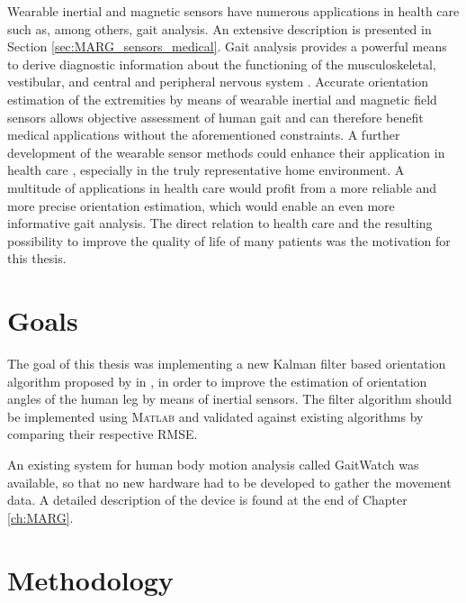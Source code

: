 Wearable inertial and magnetic sensors have numerous applications in health care such as, among others, gait analysis. An extensive description is presented in Section \ref{sec:MARG_sensors_medical}. Gait analysis provides a powerful means to derive diagnostic information about the functioning of the musculoskeletal, vestibular, and central and peripheral nervous system \cite{bennett_extended_2013}. Accurate orientation estimation of the extremities by means of wearable inertial and magnetic field sensors allows objective assessment of human gait and can therefore benefit medical applications without the aforementioned constraints. A further development of the wearable sensor methods could enhance their application in health care \cite{wong_clinical_2007}, especially in the truly representative home environment. A multitude of applications in health care would profit from a more reliable and more precise orientation estimation, which would enable an even more informative gait analysis. The direct relation to health care and the resulting possibility to improve the quality of life of many patients was the motivation for this thesis.

\section{Goals}

The goal of this thesis was implementing a new Kalman filter based orientation algorithm proposed by \citeauthor{bennett_motion_2014} in \cite{bennett_motion_2014}, in order to improve the estimation of orientation angles of the human leg by means of inertial sensors. The filter algorithm should be implemented using \textsc{Matlab}\textsuperscript{\textregistered} and validated against existing algorithms by comparing their respective \gls{RMSE}.

An existing system for human body motion analysis called GaitWatch was available, so that no new hardware had to be developed to gather the movement data. A detailed description of the device is found at the end of Chapter \ref{ch:MARG}. 

\section{Methodology}

